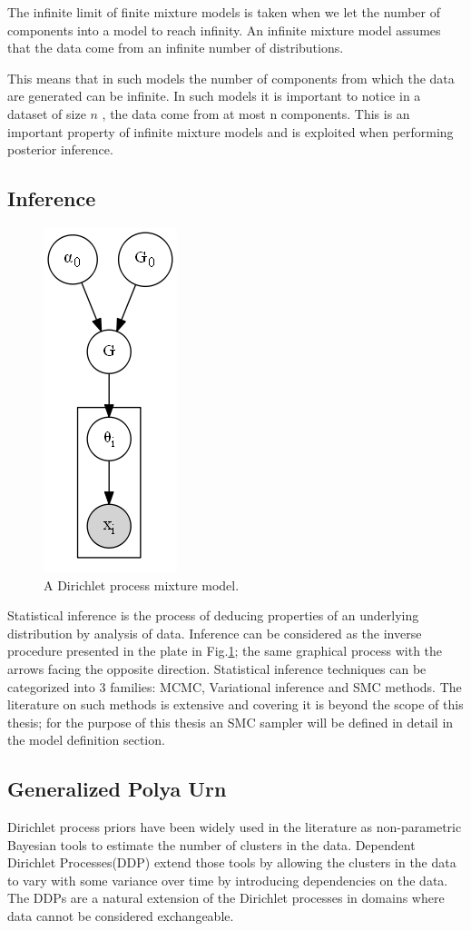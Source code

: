 \documentclass[twoside,hidelinks]{article}
\begin{document}
The infinite limit of finite mixture models is taken when we let the number of components into a model to reach infinity. An infinite mixture model assumes that the data come from an infinite number of distributions.

This means that in such models the number of components from which the data are generated can be infinite. In such models it is important to notice in a dataset of size $n$ , the data come from at most n components. This is an important property of infinite mixture models and is exploited when performing posterior inference.

\subsection{Inference}
\begin{figure}
          \centerline{\includegraphics[width=.17\textwidth]{dpmm3}}
	\caption{A Dirichlet process mixture model.}
	\label{mm}
\end{figure}


Statistical inference is the process of deducing properties of an underlying distribution by analysis of data. Inference can be considered as the inverse procedure presented in the plate in Fig.\ref{mm}; the same graphical process with the arrows facing the opposite direction. Statistical inference techniques can be categorized into 3 families: MCMC, Variational inference and SMC methods. The literature on such methods is extensive and covering it is beyond the scope of this thesis; for the purpose of this thesis an SMC sampler will be defined in detail in the model definition section. 

\subsection{Generalized Polya Urn}


Dirichlet process priors have been widely used in the literature as non-parametric Bayesian tools to estimate the number of clusters in the data\cite{antoniak}. Dependent Dirichlet Processes(DDP) extend those tools by allowing the clusters in the data to vary with some variance over time by introducing dependencies on the data. The DDPs are a natural extension of the Dirichlet processes in domains where data cannot be considered exchangeable. 
\end{document}
